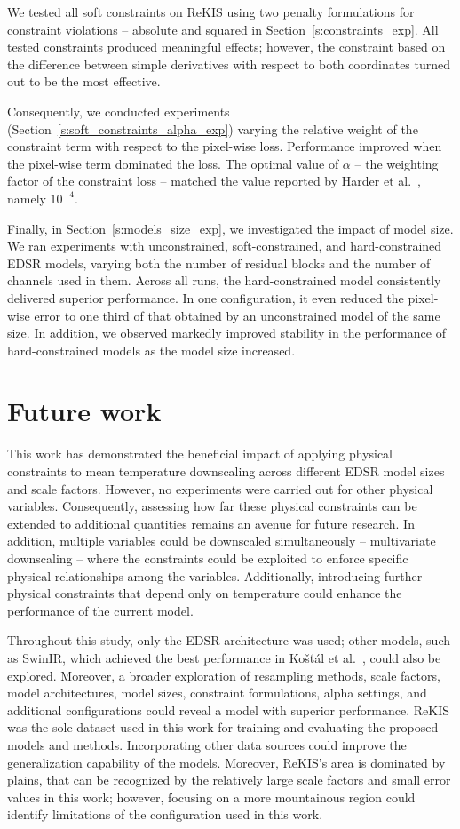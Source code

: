 We tested all soft constraints on ReKIS using two penalty formulations for constraint violations -- absolute and squared in Section~\ref{s:constraints_exp}.
All tested constraints produced meaningful effects; however, the constraint based on the difference between simple derivatives with respect to both coordinates turned out to be the most effective.

Consequently, we conducted experiments (Section~\ref{s:soft_constraints_alpha_exp}) varying the relative weight of the constraint term with respect to the pixel-wise loss.
Performance improved when the pixel-wise term dominated the loss.
The optimal value of $\alpha$ -- the weighting factor of the constraint loss -- matched the value reported by Harder et al.~\cite{Harder2023}, namely $10^{-4}$.

Finally, in Section~\ref{s:models_size_exp}, we investigated the impact of model size.
We ran experiments with unconstrained, soft-constrained, and hard-constrained EDSR models, varying both the number of residual blocks and the number of channels used in them.
Across all runs, the hard-constrained model consistently delivered superior performance.
In one configuration, it even reduced the pixel-wise error to one third of that obtained by an unconstrained model of the same size.
In addition, we observed markedly improved stability in the performance of hard-constrained models as the model size increased.

\section{Future work}

This work has demonstrated the beneficial impact of applying physical constraints to mean temperature downscaling across different EDSR model sizes and scale factors. 
However, no experiments were carried out for other physical variables. 
Consequently, assessing how far these physical constraints can be extended to additional quantities remains an avenue for future research. 
In addition, multiple variables could be downscaled simultaneously -- multivariate downscaling -- where the constraints could be exploited to enforce specific physical relationships among the variables. 
Additionally, introducing further physical constraints that depend only on temperature could enhance the performance of the current model.

Throughout this study, only the EDSR architecture was used; other models, such as SwinIR, which achieved the best performance in Košťál et al.~\cite{Kostal2025}, could also be explored. 
Moreover, a broader exploration of resampling methods, scale factors, model architectures, model sizes, constraint formulations, alpha settings, and additional configurations could reveal a model with superior performance.
\newpage
ReKIS was the sole dataset used in this work for training and evaluating the proposed models and methods. 
Incorporating other data sources could improve the generalization capability of the models.
Moreover, ReKIS's area is dominated by plains, that can be recognized by the relatively large scale factors and small error values in this work; however, focusing on a more mountainous region could identify limitations of the configuration used in this work.

